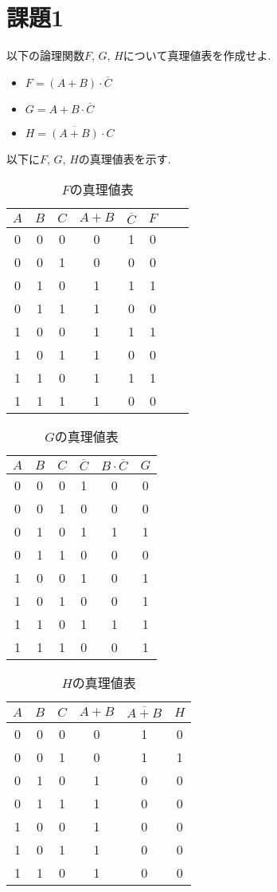 \section{課題1}
以下の論理関数$F$, $G$, $H$について真理値表を作成せよ.
\begin{itemize}
  \item $F=(A+B)\cdot\overline{C}$
  \item $G=A+B\cdot\overline{C}$
  \item $H=\overline{(A+B)}\cdot C$
\end{itemize}
以下に$F$, $G$, $H$の真理値表を示す.
\begin{table}[h]
\caption{$F$の真理値表}
\centering
\begin{tabular}{cccccccc}
\hline
$A$&$B$&$C$&$A+B$&$\overline{C}$&$F$\\
\hline \hline
0 & 0 & 0 & 0 & 1 & 0 \\
0 & 0 & 1 & 0 & 0 & 0 \\
0 & 1 & 0 & 1 & 1 & 1 \\
0 & 1 & 1 & 1 & 0 & 0 \\
1 & 0 & 0 & 1 & 1 & 1 \\
1 & 0 & 1 & 1 & 0 & 0 \\
1 & 1 & 0 & 1 & 1 & 1 \\
1 & 1 & 1 & 1 & 0 & 0 \\
\hline
\end{tabular}
\end{table}
\begin{table}[h]
\caption{$G$の真理値表}
\centering
\begin{tabular}{cccccc}
\hline
$A$&$B$&$C$&$\overline{C}$&$B\cdot\overline{C}$&$G$\\
\hline \hline
0 & 0 & 0 & 1 & 0 & 0 \\
0 & 0 & 1 & 0 & 0 & 0 \\
0 & 1 & 0 & 1 & 1 & 1 \\
0 & 1 & 1 & 0 & 0 & 0 \\
1 & 0 & 0 & 1 & 0 & 1 \\
1 & 0 & 1 & 0 & 0 & 1 \\
1 & 1 & 0 & 1 & 1 & 1 \\
1 & 1 & 1 & 0 & 0 & 1 \\
\hline
\end{tabular}
\end{table}
\begin{table}[h]
\caption{$H$の真理値表}
\centering
\begin{tabular}{cccccc}
\hline
$A$&$B$&$C$&$A+B$&$\overline{A+B}$&$H$\\
\hline \hline
0 & 0 & 0 & 0 & 1 & 0 \\
0 & 0 & 1 & 0 & 1 & 1 \\
0 & 1 & 0 & 1 & 0 & 0 \\
0 & 1 & 1 & 1 & 0 & 0 \\
1 & 0 & 0 & 1 & 0 & 0 \\
1 & 0 & 1 & 1 & 0 & 0 \\
1 & 1 & 0 & 1 & 0 & 0 \\
\hline
\end{tabular}
\end{table}